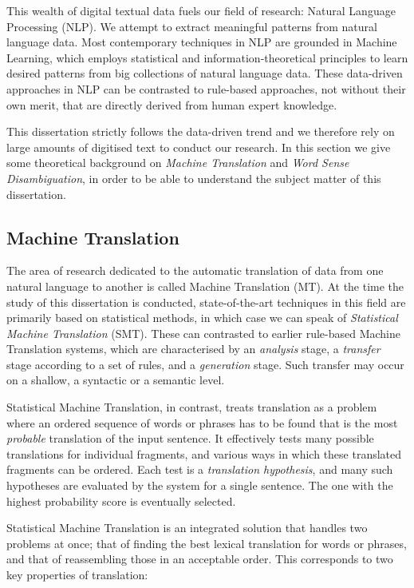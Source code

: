 This wealth of digital textual data fuels our field of research: Natural Language Processing (NLP). We attempt to
extract meaningful patterns from natural language data.  Most contemporary techniques in NLP are grounded in Machine
Learning, which employs statistical and information-theoretical principles to learn desired patterns from big
collections of natural language data. These data-driven approaches in NLP can be contrasted to rule-based approaches,
not without their own merit, that are directly derived from human expert knowledge.

This dissertation strictly follows the data-driven trend and we therefore rely
on large amounts of digitised text to conduct our research. In this section we
give some theoretical background on \emph{Machine Translation} and \emph{Word
Sense Disambiguation}, in order to be able to understand the subject matter of
this dissertation.

\subsection*{Machine Translation}
\label{sec:intromt}

The area of research dedicated to the automatic translation of data from one natural language to another is called
Machine Translation (MT).  At the time the study of this dissertation is conducted, state-of-the-art techniques in this
field are primarily based on statistical methods, in which case we can speak of \emph{Statistical Machine Translation}
(SMT). These can contrasted to earlier rule-based Machine Translation systems, which are characterised by an
\emph{analysis} stage, a \emph{transfer} stage according to a set of rules, and a \emph{generation} stage. Such transfer
may occur on a shallow, a syntactic or a semantic level.

Statistical Machine Translation, in contrast, treats translation as a problem where an
ordered sequence of words or phrases has to be found that is the most
\emph{probable} translation of the input sentence. It effectively tests many possible
translations for individual fragments, and various ways in which these
translated fragments can be ordered. Each test is a \emph{translation
hypothesis}, and many such hypotheses are evaluated by the system
for a single sentence. The one with the highest probability score is eventually
selected.

Statistical Machine Translation is an integrated solution that handles two
problems at once; that of finding the best lexical translation for words or
phrases, and that of reassembling those in an acceptable order. This corresponds to
two key properties of translation:

